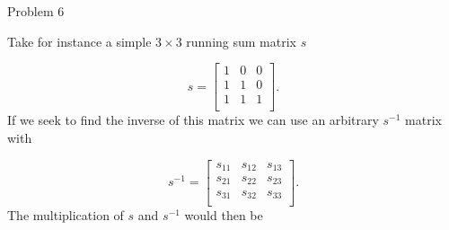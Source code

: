 \begin{problem}{Problem 6}
\begin{Highlight}[Solution]
        Take for instance a simple $3 \times 3$ running sum matrix $s$

        \begin{equation}
            s = 
            \begin{bmatrix}
                1 & 0 & 0 \\
                1 & 1 & 0 \\
                1 & 1 & 1 \\
            \end{bmatrix}.
        \end{equation}
        If we seek to find the inverse of this matrix we can use an arbitrary $s^{-1}$ matrix with

        \begin{equation}
            s^{-1} =
            \begin{bmatrix}
                s_{11} & s_{12} & s_{13} \\
                s_{21} & s_{22} & s_{23} \\
                s_{31} & s_{32} & s_{33} \\
            \end{bmatrix}.
        \end{equation}
        The multiplication of $s$ and $s^{-1}$ would then be


\end{Highlight}
\end{problem}
